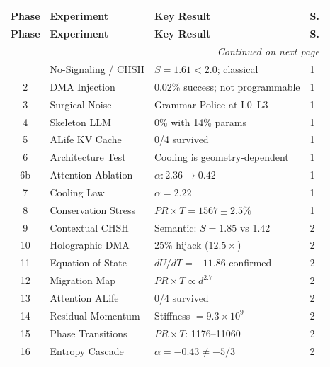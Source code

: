 \documentclass[11pt,a4paper]{article}
\begin{document}
\begin{center}
\small
\begin{longtable}{@{}clll@{}}
\toprule
\textbf{Phase} & \textbf{Experiment} & \textbf{Key Result} & \textbf{S.} \\
\midrule
\endfirsthead
\toprule
\textbf{Phase} & \textbf{Experiment} & \textbf{Key Result} & \textbf{S.} \\
\midrule
\endhead
\midrule
\multicolumn{4}{r}{\textit{Continued on next page}} \\
\bottomrule
\endfoot
\bottomrule
\endlastfoot
1  & No-Signaling / CHSH        & $S=1.61 < 2.0$; classical                & 1 \\
2  & DMA Injection              & 0.02\% success; not programmable          & 1 \\
3  & Surgical Noise             & Grammar Police at L0--L3                  & 1 \\
4  & Skeleton LLM               & 0\% with 14\% params                     & 1 \\
5  & ALife KV Cache             & 0/4 survived                             & 1 \\
6  & Architecture Test          & Cooling is geometry-dependent             & 1 \\
6b & Attention Ablation         & $\alpha: 2.36 \to 0.42$                  & 1 \\
7  & Cooling Law                & $\alpha = 2.22$                          & 1 \\
8  & Conservation Stress        & $PR \times T = 1567 \pm 2.5\%$           & 1 \\
\midrule
9  & Contextual CHSH            & Semantic: $S=1.85$ vs 1.42               & 2 \\
10 & Holographic DMA            & 25\% hijack ($12.5\times$)               & 2 \\
11 & Equation of State          & $dU/dT = -11.86$ confirmed               & 2 \\
12 & Migration Map              & $PR \times T \propto d^{2.7}$            & 2 \\
13 & Attention ALife            & 0/4 survived                             & 2 \\
14 & Residual Momentum          & Stiffness $= 9.3 \times 10^9$           & 2 \\
15 & Phase Transitions          & $PR \times T$: 1176--11060               & 2 \\
16 & Entropy Cascade            & $\alpha = -0.43 \neq -5/3$               & 2 \\

\end{longtable}
\end{center}
\end{document}
